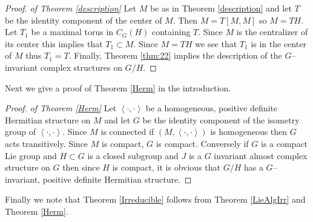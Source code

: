 \documentclass{amse-new}
\numberwithin{equation}{section} %
\begin{document}
\begin{proof}{\it of Theorem \ref{description}}
Let $M$ be as in Theorem \ref{description} and let $T$ be the identity component of the
center of $M$. Then $M=T[M,M]$ so $M=TH.$ Let $T_{1}$ be a maximal torus in $%
C_{G}(H)$ containing $T$. Since $M$ is the centralizer of its center this
implies that $T_{1}\subset M$. Since $M=TH$ we see that $T_{1}$ is in the
center of $M$ thus $T_{1}=T$. Finally, Theorem \ref{thm:22} implies the description of
the $G$--invariant complex structures on $G/H$.
\end{proof}

Next we give a proof of Theorem \ref{Herm} in the introduction.

\begin{proof}{\it of Theorem \ref{Herm}}
Let $\left\langle \cdot, \cdot\right\rangle $ be a homogeneous, positive
definite Hermitian structure on $M$ and let $G$ be the identity component of
the isometry group of $\left\langle \cdot, \cdot\right\rangle $. Since $M$ is
connected if $(M,\left\langle \cdot, \cdot\right\rangle )$ is homogeneous then
$G$ acts transitively. Since $M$ is compact, $G$ is compact. Conversely if $G$
is a compact Lie group and $H\subset G$ is a closed subgroup and $J$ is a $G$
invariant almost complex structure on $G$ then since $H$ is compact, it is
obvious that $G/H$ has a $G$--invariant, positive definite  Hermitian structure.
\end{proof}

Finally we note that Theorem \ref{Irreducible} follows from Theorem \ref{LieAlgIrr} and Theorem \ref{Herm}.



\end{document}

